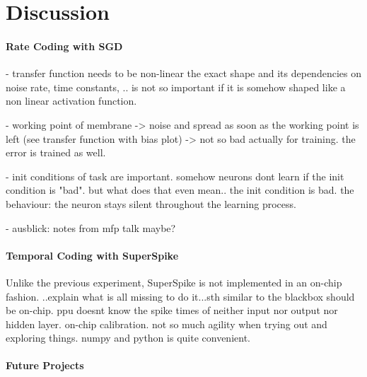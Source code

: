 \chapter{Discussion}

\subsubsection{Rate Coding with SGD}
- transfer function needs to be non-linear the exact shape and its dependencies on noise rate, time constants, .. is not so important if it is somehow shaped like a non linear activation function.

- working point of membrane -> noise and spread as soon as the working point is left (see transfer function with bias plot) -> not so bad actually for training. the error is trained as well. 

- init conditions of task are important. somehow neurons dont learn if the init condition is "bad". but what does that even  mean.. the init condition is bad. the behaviour: the neuron stays silent throughout the learning process. 

- ausblick: notes from mfp talk maybe?
\subsubsection{Temporal Coding with SuperSpike}
Unlike the previous experiment, SuperSpike is not implemented in an on-chip fashion. ..explain what is all missing to do it...sth similar to the blackbox should be on-chip. ppu doesnt know the spike times of neither input nor output nor hidden layer. on-chip calibration. not so much agility when trying out and exploring things. numpy and python is quite convenient.
\subsubsection*{Future Projects}
\label{futureprojects}